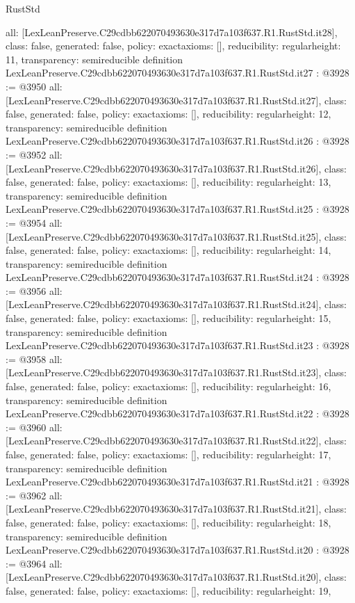 \begin{lexlean}{RustStd}
\begin{coremodule}
{  all: [LexLeanPreserve.C29cdbb622070493630e317d7a103f637.R1.RustStd.it28],
  class: false,
  generated: false,
  policy: exact{axioms: []},
  reducibility: regular{height: 11},
  transparency: semireducible
}
definition LexLeanPreserve.C29cdbb622070493630e317d7a103f637.R1.RustStd.it27 : @3928 := @3950 {
  all: [LexLeanPreserve.C29cdbb622070493630e317d7a103f637.R1.RustStd.it27],
  class: false,
  generated: false,
  policy: exact{axioms: []},
  reducibility: regular{height: 12},
  transparency: semireducible
}
definition LexLeanPreserve.C29cdbb622070493630e317d7a103f637.R1.RustStd.it26 : @3928 := @3952 {
  all: [LexLeanPreserve.C29cdbb622070493630e317d7a103f637.R1.RustStd.it26],
  class: false,
  generated: false,
  policy: exact{axioms: []},
  reducibility: regular{height: 13},
  transparency: semireducible
}
definition LexLeanPreserve.C29cdbb622070493630e317d7a103f637.R1.RustStd.it25 : @3928 := @3954 {
  all: [LexLeanPreserve.C29cdbb622070493630e317d7a103f637.R1.RustStd.it25],
  class: false,
  generated: false,
  policy: exact{axioms: []},
  reducibility: regular{height: 14},
  transparency: semireducible
}
definition LexLeanPreserve.C29cdbb622070493630e317d7a103f637.R1.RustStd.it24 : @3928 := @3956 {
  all: [LexLeanPreserve.C29cdbb622070493630e317d7a103f637.R1.RustStd.it24],
  class: false,
  generated: false,
  policy: exact{axioms: []},
  reducibility: regular{height: 15},
  transparency: semireducible
}
definition LexLeanPreserve.C29cdbb622070493630e317d7a103f637.R1.RustStd.it23 : @3928 := @3958 {
  all: [LexLeanPreserve.C29cdbb622070493630e317d7a103f637.R1.RustStd.it23],
  class: false,
  generated: false,
  policy: exact{axioms: []},
  reducibility: regular{height: 16},
  transparency: semireducible
}
definition LexLeanPreserve.C29cdbb622070493630e317d7a103f637.R1.RustStd.it22 : @3928 := @3960 {
  all: [LexLeanPreserve.C29cdbb622070493630e317d7a103f637.R1.RustStd.it22],
  class: false,
  generated: false,
  policy: exact{axioms: []},
  reducibility: regular{height: 17},
  transparency: semireducible
}
definition LexLeanPreserve.C29cdbb622070493630e317d7a103f637.R1.RustStd.it21 : @3928 := @3962 {
  all: [LexLeanPreserve.C29cdbb622070493630e317d7a103f637.R1.RustStd.it21],
  class: false,
  generated: false,
  policy: exact{axioms: []},
  reducibility: regular{height: 18},
  transparency: semireducible
}
definition LexLeanPreserve.C29cdbb622070493630e317d7a103f637.R1.RustStd.it20 : @3928 := @3964 {
  all: [LexLeanPreserve.C29cdbb622070493630e317d7a103f637.R1.RustStd.it20],
  class: false,
  generated: false,
  policy: exact{axioms: []},
  reducibility: regular{height: 19},
}
\end{coremodule}
\end{lexlean}

